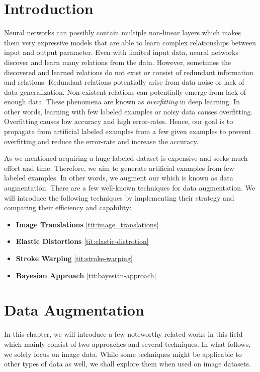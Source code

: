 \chapter{Introduction}
Neural networks can possibly contain multiple non-linear layers which makes them very expressive models
that are able to learn complex relationships between input and output parameter. Even with limited
input data, neural networks discover and learn many relations from the data. However, sometimes the
discovered and learned relations do not exist or  consist of redundant information and
relations. Redundant relations potentially arise from data-noise or lack of data-generalization.
Non-existent relations can potentially emerge from lack of enough data. These phenomena are known as
\textit{overfitting} in deep learning. In other words, learning with few labeled examples or noisy
data causes overfitting. Overfitting causes low accuracy and high error-rates. Hence, our goal is to
propagate from artificial labeled examples from a few given examples to prevent overfitting and reduce the error-rate and increase
the accuracy.

As we mentioned acquiring a huge labeled dataset is expensive and seeks much effort and time.
Therefore, we aim to generate artificial examples from few labeled examples. In other words, we
augment our which is known as data augmentation. There are a few well-known techniques for data
augmentation. We will introduce the following techniques by implementing their strategy and
comparing their efficiency and capability:
\begin{itemize}
  \item \textbf{Image Translations} \ref{tit:image_translations}
  \item \textbf{Elastic Distortions} \ref{tit:elastic-distrotion}
  \item \textbf{Stroke Warping} \ref{tit:stroke-warping}
  \item \textbf{Bayesian Approach} \ref{tit:bayesian-approach}
\end{itemize}


\chapter{Data Augmentation}
\label{tit:data-augmentation}
In this chapter, we will introduce a few noteworthy related works in this field which mainly consist
of two approaches and several techniques.
In what follows, we solely focus on image data.  While some techniques might be applicable to other
types of data as well, we shall explore them when used on image datasets.

